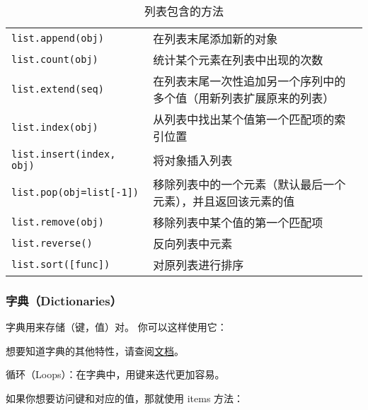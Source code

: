 \begin{table}[htbp]
  \centering
  \caption{列表包含的方法}
  \begin{tabular}{l|l}\hline
    \lstinline|list.append(obj)       |  &在列表末尾添加新的对象 \\
    \lstinline|list.count(obj)        |  &统计某个元素在列表中出现的次数\\
    \lstinline|list.extend(seq)       |  &在列表末尾一次性追加另一个序列中的多个值（用新列表扩展原来的列表）\\
    \lstinline|list.index(obj)        |  &从列表中找出某个值第一个匹配项的索引位置\\
    \lstinline|list.insert(index, obj)|  &将对象插入列表\\
    \lstinline|list.pop(obj=list[-1]) |  &移除列表中的一个元素（默认最后一个元素），并且返回该元素的值\\
    \lstinline|list.remove(obj)       |  &移除列表中某个值的第一个匹配项\\
    \lstinline|list.reverse()         |  &反向列表中元素\\
    \lstinline|list.sort([func])      |  &对原列表进行排序\\\hline
  \end{tabular}                          
\end{table}

  
\subsubsection{字典（Dictionaries）}


字典用来存储（键，值）对。%
你可以这样使用它：


想要知道字典的其他特性，请查阅\href{https://docs.python.org/3.5/library/stdtypes.html#dict}{文档}。




循环（Loops）：在字典中，用键来迭代更加容易。





如果你想要访问键和对应的值，那就使用 items 方法：


